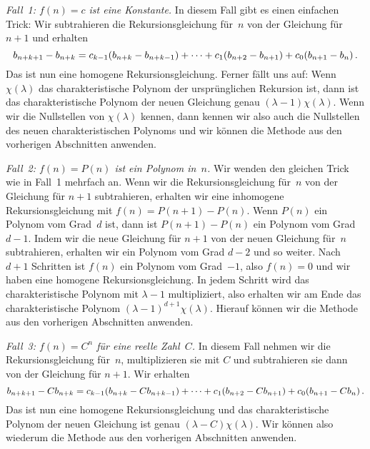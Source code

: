 \emph{Fall~1: $f(n)=c$ ist eine Konstante.} In diesem Fall gibt es einen einfachen Trick: Wir subtrahieren die Rekursionsgleichung für~$n$ von der Gleichung für $n+1$ und erhalten
\begin{equation*}
	b_{n+k+1}-b_{n+k}=c_{k-1}\parens*{b_{n+k}-b_{n+k-1}}+\dotsb+c_1\parens*{b_{n+2}-b_{n+1}}+c_0\parens*{b_{n+1}-b_n}\,.
\end{equation*}
Das ist nun eine homogene Rekursionsgleichung. Ferner fällt uns auf: Wenn $\chi(\lambda)$ das charakteristische Polynom der ursprünglichen Rekursion ist, dann ist das charakteristische Polynom der neuen Gleichung genau $(\lambda-1)\chi(\lambda)$. Wenn wir die Nullstellen von $\chi(\lambda)$ kennen, dann kennen wir also auch die Nullstellen des neuen charakteristischen Polynoms und wir können die Methode aus den vorherigen Abschnitten anwenden.

\emph{Fall~2: $f(n)=P(n)$ ist ein Polynom in~$n$.} Wir wenden den gleichen Trick wie in Fall~1 mehrfach an. Wenn wir die Rekursionsgleichung für~$n$ von der Gleichung für $n+1$ subtrahieren, erhalten wir eine inhomogene Rekursionsgleichung mit $f(n)=P(n+1)-P(n)$. Wenn $P(n)$ ein Polynom vom Grad~$d$ ist, dann ist $P(n+1)-P(n)$ ein Polynom vom Grad~$d-1$. Indem wir die neue Gleichung für $n+1$ von der neuen Gleichung für~$n$ subtrahieren, erhalten wir ein Polynom vom Grad $d-2$ und so weiter. Nach $d+1$ Schritten ist $f(n)$ ein Polynom vom Grad~$-1$, also $f(n)=0$ und wir haben eine homogene Rekursionsgleichung. In jedem Schritt wird das charakteristische Polynom mit $\lambda-1$ multipliziert, also erhalten wir am Ende das charakteristische Polynom $(\lambda-1)^{d+1}\chi(\lambda)$. Hierauf können wir die Methode aus den vorherigen Abschnitten anwenden.

\emph{Fall~3: $f(n)=C^n$ für eine reelle Zahl~$C$.} In diesem Fall nehmen wir die Rekursionsgleichung für~$n$, multiplizieren sie mit $C$ und subtrahieren sie dann von der Gleichung für $n+1$. Wir erhalten
\begin{equation*}
	b_{n+k+1}-Cb_{n+k}=c_{k-1}\parens*{b_{n+k}-Cb_{n+k-1}}+\dotsb+c_1\parens*{b_{n+2}-Cb_{n+1}}+c_0\parens*{b_{n+1}-Cb_n}\,.
\end{equation*}
Das ist nun eine homogene Rekursionsgleichung und das charakteristische Polynom der neuen Gleichung ist genau $(\lambda-C)\chi(\lambda)$. Wir können also wiederum die Methode aus den vorherigen Abschnitten anwenden.


